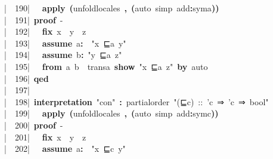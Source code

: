 \documentclass{article}
\newcommand{\syntaxKEYWORDA}[1]{\textcolor[rgb]{0.0,0.4,0.6}{\textbf{#1}}}
\newcommand{\syntaxKEYWORDC}[1]{\textcolor[rgb]{0.0,0.6,1.0}{\textbf{#1}}}
\newcommand{\syntaxLITERALA}[1]{\textcolor[rgb]{1.0,0.0,0.8}{#1}}
\newcommand{\syntaxOPERATOR}[1]{\textcolor[rgb]{0.0,0.0,0.0}{\textbf{#1}}}
\newcommand{\syntaxKEYWORDA}[1]{\textcolor[rgb]{0.0,0.4,0.6}{\textbf{#1}}}
\newcommand{\syntaxKEYWORDC}[1]{\textcolor[rgb]{0.0,0.6,1.0}{\textbf{#1}}}
\newcommand{\syntaxLITERALA}[1]{\textcolor[rgb]{1.0,0.0,0.8}{#1}}
\newcommand{\syntaxOPERATOR}[1]{\textcolor[rgb]{0.0,0.0,0.0}{\textbf{#1}}}
\newcommand{\syntaxKEYWORDA}[1]{\textcolor[rgb]{0.0,0.4,0.6}{\textbf{#1}}}
\newcommand{\syntaxKEYWORDC}[1]{\textcolor[rgb]{0.0,0.6,1.0}{\textbf{#1}}}
\newcommand{\syntaxLITERALA}[1]{\textcolor[rgb]{1.0,0.0,0.8}{#1}}
\newcommand{\syntaxOPERATOR}[1]{\textcolor[rgb]{0.0,0.0,0.0}{\textbf{#1}}}
\newcommand{\syntaxKEYWORDA}[1]{\textcolor[rgb]{0.0,0.4,0.6}{#1}}
\newcommand{\syntaxKEYWORDC}[1]{\textcolor[rgb]{0.0,0.6,1.0}{#1}}
\newcommand{\syntaxLITERALA}[1]{\textcolor[rgb]{1.0,0.0,0.8}{\textbf{#1}}}
\newcommand{\syntaxOPERATOR}[1]{\textcolor[rgb]{0.0,0.0,0.0}{#1}}
\newcommand{\syntaxKEYWORDA}[1]{\textcolor[rgb]{0.0,0.4,0.6}{\textbf{#1}}}
\newcommand{\syntaxKEYWORDC}[1]{\textcolor[rgb]{0.0,0.6,1.0}{\textbf{#1}}}
\newcommand{\syntaxLITERALA}[1]{\textcolor[rgb]{1.0,0.0,0.8}{#1}}
\newcommand{\syntaxOPERATOR}[1]{\textcolor[rgb]{0.0,0.0,0.0}{\textbf{#1}}}
\newcommand{\syntaxKEYWORDA}[1]{\textcolor[rgb]{0.0,0.4,0.6}{\textbf{#1}}}
\newcommand{\syntaxKEYWORDC}[1]{\textcolor[rgb]{0.0,0.6,1.0}{\textbf{#1}}}
\newcommand{\syntaxLITERALA}[1]{\textcolor[rgb]{1.0,0.0,0.8}{#1}}
\newcommand{\syntaxOPERATOR}[1]{\textcolor[rgb]{0.0,0.0,0.0}{\textbf{#1}}}
\newcommand{\syntaxKEYWORDA}[1]{\textcolor[rgb]{0.0,0.0,0.0}{#1}}
\newcommand{\syntaxKEYWORDC}[1]{\textcolor[rgb]{0.0,0.0,0.0}{#1}}
\newcommand{\gutter}[1]{\textcolor[rgb]{0,0,0}{{|}#1}}
\newcommand{\gutterH}[1]{\textcolor[rgb]{1,0,0}{{|}#1}}
\begin{document}
\gutterH{\ \ 190{|}\ }{\ }{\ }\syntaxKEYWORDA{apply}{\ }\syntaxOPERATOR{(}unfold\usebox{\underscorebox}locales{\ }\syntaxOPERATOR{,}{\ }\syntaxOPERATOR{(}auto{\ }simp{\ }add\syntaxOPERATOR{:}syma\syntaxOPERATOR{)}\syntaxOPERATOR{)}\hspace*{\fill}\\
\gutter{\ \ 191{|}\ }\syntaxKEYWORDA{proof}{\ }{-}\hspace*{\fill}\\
\gutter{\ \ 192{|}\ }{\ }{\ }\syntaxKEYWORDC{fix}{\ }x{\ }{\ }y{\ }{\ }z{\ }{\ }\hspace*{\fill}\\
\gutter{\ \ 193{|}\ }{\ }{\ }\syntaxKEYWORDC{assume}{\ }a\syntaxOPERATOR{:}{\ }{\ }\syntaxLITERALA{"x{\ }⊑a{\ }y"}\hspace*{\fill}\\
\gutter{\ \ 194{|}\ }{\ }{\ }\syntaxKEYWORDC{assume}{\ }b\syntaxOPERATOR{:}{\ }\syntaxLITERALA{"y{\ }⊑a{\ }z"}\hspace*{\fill}\\
\gutterH{\ \ 195{|}\ }{\ }{\ }\syntaxKEYWORDA{from}{\ }a{\ }b{\ }{\ }transa{\ }\syntaxKEYWORDC{show}{\ }\syntaxLITERALA{"x{\ }⊑a{\ }z"}{\ }\syntaxKEYWORDA{by}{\ }auto{\ }\hspace*{\fill}\\
\gutter{\ \ 196{|}\ }\syntaxKEYWORDA{qed}{\ }\hspace*{\fill}\\
\gutter{\ \ 197{|}\ }\hspace*{\fill}\\
\gutter{\ \ 198{|}\ }\syntaxKEYWORDA{interpretation}{\ }\syntaxLITERALA{"con"}{\ }\syntaxOPERATOR{:}{\ }partial\usebox{\underscorebox}order{\ }\syntaxLITERALA{"(⊑c){\ }::{\ }'c{\ }⇒{\ }'c{\ }⇒{\ }bool"}\hspace*{\fill}\\
\gutter{\ \ 199{|}\ }{\ }{\ }\syntaxKEYWORDA{apply}{\ }\syntaxOPERATOR{(}unfold\usebox{\underscorebox}locales{\ }\syntaxOPERATOR{,}{\ }\syntaxOPERATOR{(}auto{\ }simp{\ }add\syntaxOPERATOR{:}symc\syntaxOPERATOR{)}\syntaxOPERATOR{)}{\ }{\ }{\ }{\ }\hspace*{\fill}\\
\gutterH{\ \ 200{|}\ }\syntaxKEYWORDA{proof}{\ }{-}\hspace*{\fill}\\
\gutter{\ \ 201{|}\ }{\ }{\ }\syntaxKEYWORDC{fix}{\ }x{\ }{\ }y{\ }{\ }z{\ }{\ }\hspace*{\fill}\\
\gutter{\ \ 202{|}\ }{\ }{\ }\syntaxKEYWORDC{assume}{\ }a\syntaxOPERATOR{:}{\ }{\ }\syntaxLITERALA{"x{\ }⊑c{\ }y"}\hspace*{\fill}\\
\end{document}

